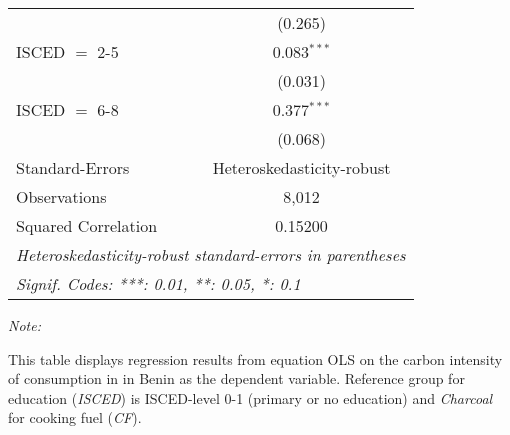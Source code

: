 \begin{table}[htbp!]
\begin{adjustbox}{width = 1\textwidth, max height = 0.95\textheight, center}
\begin{threeparttable}[b]
\begin{tabular}{lc}
                                & (0.265)\\   
            ISCED $=$ 2-5       & 0.083$^{***}$\\   
                                & (0.031)\\   
            ISCED $=$ 6-8       & 0.377$^{***}$\\   
                                & (0.068)\\   
            \midrule 
            Standard-Errors     & Heteroskedasticity-robust \\   
            Observations        & 8,012\\  
            Squared Correlation & 0.15200\\  
            \midrule \midrule
            \multicolumn{2}{l}{\emph{Heteroskedasticity-robust standard-errors in parentheses}}\\
            \multicolumn{2}{l}{\emph{Signif. Codes: ***: 0.01, **: 0.05, *: 0.1}}\\
         \end{tabular}
         
         \begin{tablenotes}\item \medskip \textit{Note:}
            \item This table displays regression results from equation OLS on the carbon intensity of consumption in  in Benin as the dependent variable. Reference group for education (\textit{ISCED}) is ISCED-level 0-1 (primary or no education) and \textit{Charcoal} for cooking fuel (\textit{CF}).
         \end{tablenotes}
      \end{threeparttable}
   \end{adjustbox}
\end{table}


